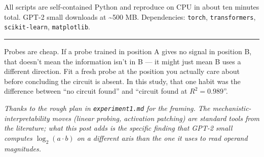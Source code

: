 \documentclass[
]{article}
\begin{document}
All scripts are self-contained Python and reproduce on CPU in about ten
minutes total. GPT-2 small downloads at \textasciitilde500 MB.
Dependencies: \texttt{torch}, \texttt{transformers},
\texttt{scikit-learn}, \texttt{matplotlib}.

\begin{center}\rule{0.5\linewidth}{0.5pt}\end{center}

\begin{tcolorbox}[enhanced jigsaw, arc=.35mm, bottomrule=.15mm, bottomtitle=1mm, breakable, colback=white, colbacktitle=quarto-callout-tip-color!10!white, colframe=quarto-callout-tip-color-frame, coltitle=black, left=2mm, leftrule=.75mm, opacityback=0, opacitybacktitle=0.6, rightrule=.15mm, title=\textcolor{quarto-callout-tip-color}{\faLightbulb}\hspace{0.5em}{Methodological takeaway}, titlerule=0mm, toprule=.15mm, toptitle=1mm]

Probes are cheap. If a probe trained in position A gives no signal in
position B, that doesn't mean the information isn't in B --- it might
just mean B uses a different direction. Fit a fresh probe at the
position you actually care about before concluding the circuit is
absent. In this study, that one habit was the difference between ``no
circuit found'' and ``circuit found at \(R^2 = 0.989\)''.

\end{tcolorbox}

\emph{Thanks to the rough plan in \texttt{experiment1.md} for the
framing. The mechanistic-interpretability moves (linear probing,
activation patching) are standard tools from the literature; what this
post adds is the specific finding that GPT-2 small computes
\(\log_2(a \cdot b)\) on a different axis than the one it uses to read
operand magnitudes.}
\end{document}
